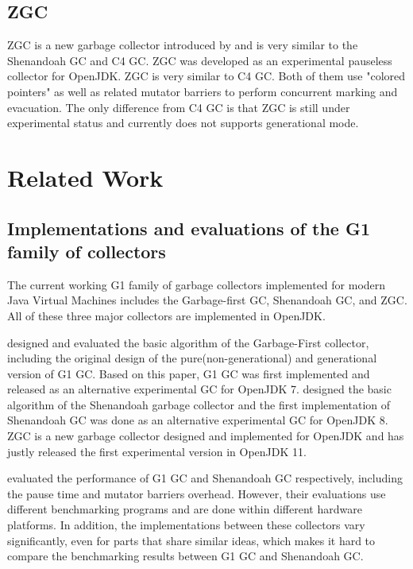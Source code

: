 \subsection{ZGC}

ZGC is a new garbage collector introduced by \cite{liden_karlsson_2018} and
is very similar to the Shenandoah GC and C4 GC. ZGC was developed as an experimental
pauseless collector for OpenJDK.
ZGC is very similar to C4 GC. Both of them use "colored pointers" as well as related
mutator barriers to perform concurrent marking and evacuation.
The only difference from C4 GC is that ZGC is still under experimental status and
currently does not supports generational mode.

\section{Related Work}
\label{sec:relatedwork}

\subsection{Implementations and evaluations of the G1 family of collectors}

The current working G1 family of garbage collectors implemented for modern Java Virtual Machines
includes the Garbage-first GC, Shenandoah GC, and ZGC.
All of these three major collectors are implemented in OpenJDK.

\cite{detlefs2004garbage} designed and evaluated the basic algorithm of the Garbage-First collector,
including the original design of the pure(non-generational) and generational version
of G1 GC. Based on this paper, G1 GC was first implemented and released as an alternative
experimental GC for OpenJDK 7. \cite{flood2016shenandoah} designed the basic algorithm
of the Shenandoah garbage collector and the first implementation of Shenandoah GC was done as an alternative experimental GC for OpenJDK 8.
ZGC is a new garbage collector designed and implemented for OpenJDK
and has justly released the first experimental version in OpenJDK 11.

\citep{detlefs2004garbage,flood2016shenandoah} evaluated the performance of G1 GC
and Shenandoah GC respectively, including the pause time and mutator barriers overhead.
However, their evaluations use different benchmarking programs and are done within
different hardware platforms. In addition, the implementations between these collectors
vary significantly, even for parts that share similar ideas, which makes it hard to
compare the benchmarking results between G1 GC and Shenandoah GC.

